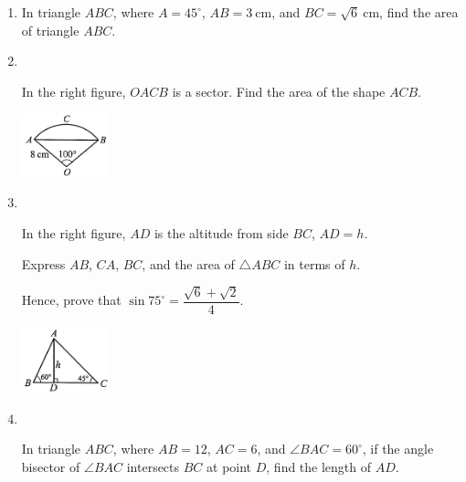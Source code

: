 \documentclass{report}
\begin{document}
\begin{enumerate}
        \item In triangle $ABC$, where $A = 45^\circ$, $AB = 3 \mathrm{~cm}$, and $BC = \sqrt{6} \mathrm{~cm}$, find the area of triangle $ABC$.
        
        \item \parbox[t]{0.9\textwidth}{
            ~
            \vspace{-1.1em}
            \begin{vwcol}[widths={0.7,0.3}, sep=8mm, rule=0pt]
                In the right figure, $OACB$ is a sector. Find the area of the shape $ACB$.
    
                \includegraphics[width=0.2\textwidth]{assets/10-48.jpg}
            \end{vwcol}
        }
        
        \vspace{3em}
        \item \parbox[t]{0.9\textwidth}{
            ~
            \vspace{-1.1em}
            \begin{vwcol}[widths={0.7,0.3}, sep=8mm, rule=0pt]
                In the right figure, $AD$ is the altitude from side $BC$, $AD = h$.
        
                \noindent Express $AB$, $CA$, $BC$, and the area of $\triangle ABC$ in terms of $h$.
                
                \noindent Hence, prove that $\sin 75^\circ = \dfrac{\sqrt{6} + \sqrt{2}}{4}$.
    
                \includegraphics[width=0.2\textwidth]{assets/10-49.jpg}
            \end{vwcol}
        }

        \item \parbox[t]{0.9\textwidth}{
            ~
            \vspace{-1.1em}
            \begin{vwcol}[widths={0.7,0.3}, sep=8mm, rule=0pt]
                In triangle $ABC$, where $AB = 12$, $AC = 6$, and $\angle BAC = 60^\circ$, if the angle bisector of $\angle BAC$ intersects $BC$ at point $D$, find the length of $AD$.
    

\end{vwcol}}
\end{enumerate}
\end{document}
